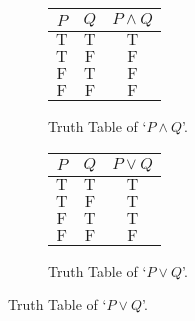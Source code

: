 \begin{figure}[H]
\begin{subfigure}{.5\textwidth}
\begin{center}
    \begin{tabular}{cc|c}
         $P$&$Q$&$P \land {Q} $\\
         \hline
         $\mathrm{T}$&$\mathrm{T}$&$\mathrm{T}$\\
         $\mathrm{T}$&$\mathrm{F}$&$\mathrm{F}$\\
         $\mathrm{F}$&$\mathrm{T}$&$\mathrm{F}$\\
         $\mathrm{F}$&$\mathrm{F}$&$\mathrm{F}$
    \end{tabular}
\end{center}
\caption{Truth Table of `$P \land Q$'.}
\label{fig:ttpandq}
\end{subfigure}
\begin{subfigure}{.5\textwidth}
\begin{center}
    \begin{tabular}{cc|c}
         $P$&$Q$&$P\lor{Q} $\\
         \hline
         $\mathrm{T}$&$\mathrm{T}$&$\mathrm{T}$\\
         $\mathrm{T}$&$\mathrm{F}$&$\mathrm{T}$\\
         $\mathrm{F}$&$\mathrm{T}$&$\mathrm{T}$\\
         $\mathrm{F}$&$\mathrm{F}$&$\mathrm{F}$
    \end{tabular}
\end{center}
\caption{Truth Table of `$P \lor Q$'.}
\label{fig:ttporq}
\end{subfigure}
\end{figure}

